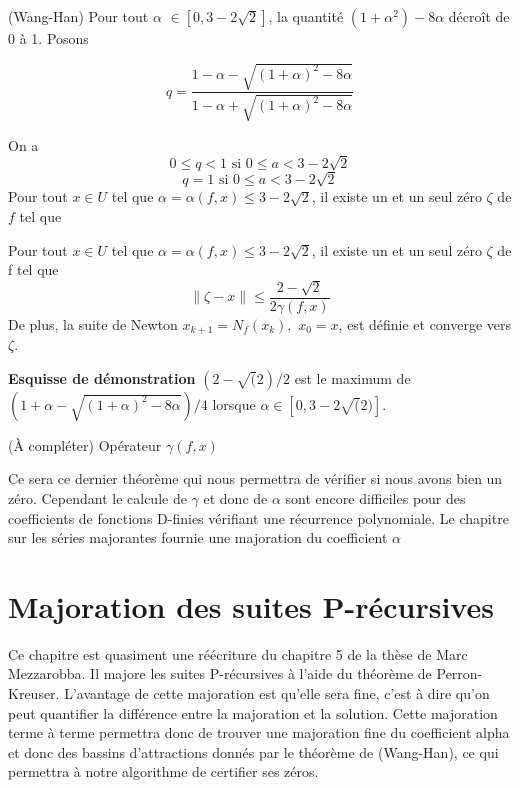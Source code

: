 \documentclass[a4paper,10.5pt]{article}
\begin{document}
	
	\begin{theorem} (Wang-Han)
		Pour tout $\alpha$ $\in [0,3-2\sqrt{2}]$, la quantité $(1+\alpha^{2})-8\alpha$ décroît de 0 à 1. Posons
		
		\[q=\frac{1-\alpha-\sqrt{(1+\alpha)^{2}-8\alpha}}{1-\alpha+\sqrt{(1+\alpha)^{2}-8\alpha}}\]
		
		On a
		\[0 \leq q<1 \text{ si } 0 \leq a < 3-2\sqrt{2}\]
		\[q=1        \text{ si } 0 \leq a < 3-2\sqrt{2}\]
		Pour tout $x\in U$ tel que $\alpha=\alpha(f,x) \leq 3-2\sqrt{2}$, il existe un et un seul zéro $\zeta$ de $f$ tel que\\
	\end{theorem}
	
	
	\begin{corollaire}
		Pour tout $x\in U$ tel que $\alpha=\alpha(f,x) \leq 3-2\sqrt{2}$, il existe un et un seul zéro $\zeta$ de f tel que
		\[\left\|\zeta-x\right\|\leq\frac{2-\sqrt{2}}{2\gamma(f,x)}\]
		De plus, la suite de Newton $x_{k+1}=N_{f}(x_{k}),$ $x_{0}=x$, est définie et converge vers $\zeta$.
	\end{corollaire}
	\noindent \textbf{Esquisse de démonstration} $(2-\sqrt(2)/2$ est le maximum de $(1+\alpha-\sqrt{(1+\alpha)^{2}-8\alpha})/4$ lorsque $\alpha \in [0,3-2\sqrt(2)]$.
	
	(À compléter)
	\noindent Opérateur $\gamma(f,x)$
	
	Ce sera ce dernier théorème qui nous permettra de vérifier si nous avons bien un zéro. Cependant le calcule de $\gamma$ et donc de $\alpha$ sont encore difficiles pour des coefficients de fonctions D-finies vérifiant une récurrence polynomiale. Le chapitre sur les séries majorantes fournie une majoration du coefficient $\alpha$
	
	
	
	
	\section{Majoration des suites P-récursives}
	
	Ce chapitre est quasiment une réécriture du chapitre 5 de la thèse de Marc Mezzarobba. Il majore les suites P-récursives à l'aide du théorème de Perron-Kreuser.
	L'avantage de cette majoration est qu'elle sera fine, c'est à dire qu'on peut quantifier la différence entre la majoration et la solution.
	Cette majoration terme à terme permettra donc de trouver une majoration fine du coefficient alpha et donc des bassins d'attractions donnés par le théorème de (Wang-Han), ce qui permettra à notre algorithme de certifier ses zéros.
	
\end{document}
